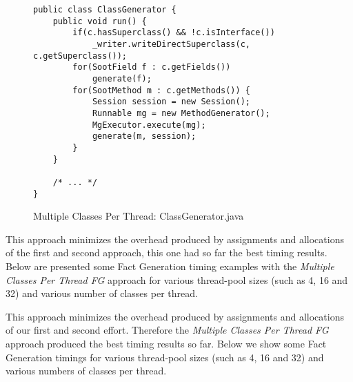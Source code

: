\documentclass{dithesis}
\begin{document}
        \begin{figure}[H]
\begin{lstlisting}
public class ClassGenerator {
    public void run() {
        if(c.hasSuperclass() && !c.isInterface())
            _writer.writeDirectSuperclass(c, c.getSuperclass());
        for(SootField f : c.getFields())
            generate(f);
        for(SootMethod m : c.getMethods()) {
            Session session = new Session();
            Runnable mg = new MethodGenerator();
            MgExecutor.execute(mg);
            generate(m, session);
        }
    }

    /* ... */
}
\end{lstlisting}
        \caption{Multiple Classes Per Thread: ClassGenerator.java}
        \end{figure}

        This approach minimizes the overhead produced by assignments and allocations of the first and second approach, this one had so far the best timing results. Below are presented some Fact Generation timing examples with the \textit{Multiple Classes Per Thread FG} approach for various thread-pool sizes (such as 4, 16 and 32) and various number of classes per thread.

        This approach minimizes the overhead produced by assignments and allocations of our first and second effort. Therefore the \textit{Multiple Classes Per Thread FG} approach produced the best timing results so far. Below we show some Fact Generation timings for various thread-pool sizes (such as 4, 16 and 32) and various numbers of classes per thread.
\end{document}
